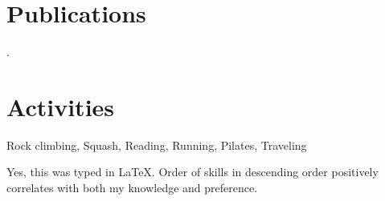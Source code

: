 \documentclass[10pt]{article}
\begin{document}


\section*{Publications}
.

\section*{Activities}
\begin{description}
	\setlength\itemsep{0.05em}
	\item Rock climbing, Squash, Reading, Running, Pilates, Traveling
\end{description}


{\vfill
\scriptsize\hfill Yes, this was typed in \LaTeX. Order of skills in descending order positively correlates with both my knowledge and preference.}

\end{document}
